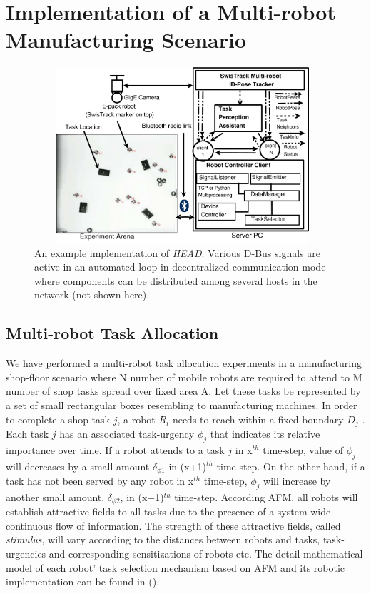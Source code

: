 \documentclass{ifacconf}
\begin{document}
\section{Implementation of a Multi-robot Manufacturing Scenario}
\label{sec:impl}
\begin{figure}
\begin{center}
\includegraphics[width=11cm,height=6.5cm]{./dia-files/RIL-Expt-Setup3}    %
\caption{An example implementation of {\em HEAD}. Various D-Bus signals are active in an automated loop in decentralized communication mode where components can be distributed among several hosts in the network (not shown here).} 
\label{fig:setup}
\end{center}
\end{figure}
\subsection{Multi-robot Task Allocation}
We have performed a multi-robot task allocation experiments in a manufacturing shop-floor scenario where N number of mobile robots are required to attend to M number of shop tasks spread over  fixed area A. Let these tasks be represented by a set of small rectangular boxes resembling to manufacturing machines. In order to complete a shop task $j$, a robot $R_i$ needs to reach within a fixed boundary $D_{j}$ . Each task $j$ has an associated task-urgency $\phi_j$ that indicates its relative importance over time. If a robot attends to a task $j$ in x$^{th}$ time-step, value of $\phi_j$ will decreases by a small amount $\delta_{\phi 1}$ in (x+1)$^{th}$ time-step. On the other hand, if a task has not been served by any robot in x$^{th}$ time-step, $\phi_j$ will increase by another small amount, $\delta_{\phi 2}$, in (x+1)$^{th}$ time-step. According AFM, all robots will establish attractive fields to all tasks due to the presence of a system-wide continuous flow of information. The strength of these attractive fields, called {\em stimulus}, will vary according to the distances between robots and tasks, task-urgencies and corresponding sensitizations of robots etc. The detail mathematical model of each robot' task selection mechanism based on AFM and its robotic implementation can be found in (\cite{Arcaute+2008,Sarker+2010ants}).
\end{document}
